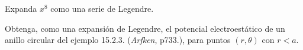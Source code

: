 \begin{ejercicio}
	Expanda $x^8$ como una serie de Legendre.
\end{ejercicio}



\begin{ejercicio}
	Obtenga, como una expansión de Legendre, el potencial electroestático de un anillo circular del ejemplo 15.2.3. (\textit{Arfken}, p733.), para puntos $(r,\theta)$ con $r < a$.
\end{ejercicio}














